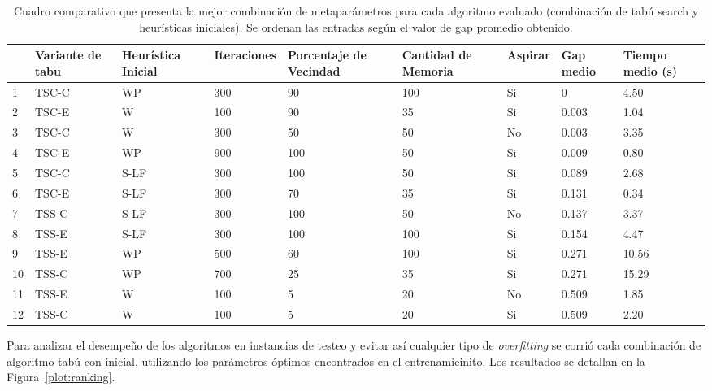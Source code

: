 \begin{table}[ht]
\centering
\begin{tabular}{p{.5cm}p{1.5cm}p{1.8cm}p{1.8cm}p{2cm}p{1.8cm}p{1cm}p{1cm}p{1cm}}
  \hline
 & Variante de tabu & Heurística Inicial & Iteraciones & Porcentaje de Vecindad & Cantidad de Memoria & Aspirar & Gap medio & Tiempo medio (s) \\ 
  \hline
1 & TSC-C & WP & 300 & 90 & 100 & Si & 0 & 4.50 \\ 
  2 & TSC-E & W & 100 & 90 & 35 & Si & 0.003 & 1.04 \\ 
  3 & TSC-C & W & 300 & 50 & 50 & No & 0.003 & 3.35 \\ 
  4 & TSC-E & WP & 900 & 100 & 50 & Si & 0.009 & 0.80 \\ 
  5 & TSC-C & S-LF & 300 & 100 & 50 & Si & 0.089 & 2.68 \\ 
  6 & TSC-E & S-LF & 300 & 70 & 35 & Si & 0.131 & 0.34 \\ 
  7 & TSS-C & S-LF & 300 & 100 & 50 & No & 0.137 & 3.37 \\ 
  8 & TSS-E & S-LF & 300 & 100 & 100 & Si & 0.154 & 4.47 \\ 
  9 & TSS-E & WP & 500 & 60 & 100 & Si & 0.271 & 10.56 \\ 
  10 & TSS-C & WP & 700 & 25 & 35 & Si & 0.271 & 15.29 \\ 
  11 & TSS-E & W & 100 & 5 & 20 & No & 0.509 & 1.85 \\ 
  12 & TSS-C & W & 100 & 5 & 20 & Si & 0.509 & 2.20 \\ 
   \hline
\end{tabular}
\caption{Cuadro comparativo que presenta la mejor combinación de metaparámetros para cada algoritmo evaluado (combinación de tabú search y heurísticas iniciales). Se ordenan las entradas según el valor de gap promedio obtenido.}
\label{tabla:ranking}
\end{table}

Para analizar el desempeño de los algoritmos en instancias de testeo y evitar así cualquier tipo de \textit{overfitting} se corrió cada combinación de algoritmo tabú con inicial, utilizando los parámetros óptimos encontrados en el entrenamieinito. Los resultados se detallan en la Figura~\ref{plot:ranking}.


